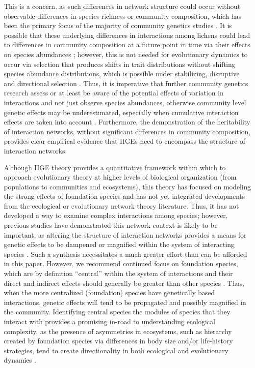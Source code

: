 \documentclass[fleqn,12pt]{olplainarticle}
\begin{document}
This is a concern, as such differences in network structure could
occur without observable differences in species richness or community
composition, which has been the primary focus of the majority of
community genetics studies
\citep{Whitham2020IntraspecificEvolution}. It is possible that these
underlying differences in interactions among lichens could lead to
differences in community composition at a future point in time via
their effects on species abundances
\citep{Shuster2006COMMUNITYSTRUCTURE-fix}; however, this is not needed
for evolutionary dynamics to occur via selection that produces shifts
in trait distributions without shifting species abundance
distributions, which is possible under stabilizing, disruptive and
directional selection \citep{Conner2004ATextbook}. Thus, it is
imperative that further community genetics research assess or at least
be aware of the potential effects of variation in interactions and not
just observe species abundances, otherwise community level genetic
effects may be underestimated, especially when cumulative interaction
effects are taken into account
\citep{Borrett2007FunctionalProliferation, Borrett2010}. Furthermore,
the demonstration of the heritability of interaction networks, without
significant differences in community composition, provides clear
empirical evidence that IIGEs need to encompass the structure of
interaction networks.

Although IIGE theory provides a quantitative framework within which to
approach evolutionary theory at higher levels of biological
organization (from populations to communities and ecosystems), this
theory has focused on modeling the strong effects of foundation
species \citep{Shuster2006COMMUNITYSTRUCTURE-fix, Whitham2012,
  Whitham2020IntraspecificEvolution} and has not yet integrated
developments from the ecological or evolutionary network theory
literature. Thus, it has not developed a way to examine complex
interactions among species; however, previous studies have
demonstrated this network context is likely to be important, as
altering the structure of interaction networks provides a means for
genetic effects to be dampened or magnified within the system of
interacting species \citep{Smith2011, Keith2017}. Such a synthesis
necessitates a much greater effort than can be afforded in this paper.
However, we recommend continued focus on foundation species, which are
by definition ``central'' within the system of interactions and their
direct and indirect effects should generally be greater than other
species \citep{Ellison2005}. Thus, when the more centralized
(foundation) species have genetically based interactions, genetic
effects will tend to be propagated and possibly magnified in the
community. Identifying central species the modules of species that
they interact with provides a promising in-road to understanding
ecological complexity, as the presence of asymmetries in ecosystems,
such as hierarchy created by foundation species via differences in
body size and/or life-history strategies, tend to create
directionality in both ecological and evolutionary dynamics
\citep{Ellison2005, Bascompte2006, Whitham2020IntraspecificEvolution,
  Guimaraes2020TheOrganization}.
\end{document}
